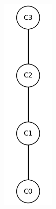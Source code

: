 \documentclass[runningheads,a4paper]{llncs}
\begin{document}
\begin{example}
\begin{figure}
\begin{minipage}{\textwidth}
\begin{minipage}{0.1\textwidth}
			\includegraphics[height = 2\textwidth]{im/ex-ma2-other-contexts-1.png}
		\end{minipage}
		\begin{minipage}{0.2\textwidth}
			\centering

\end{minipage}
\end{minipage}
\end{figure}
\end{example}
\end{document}
